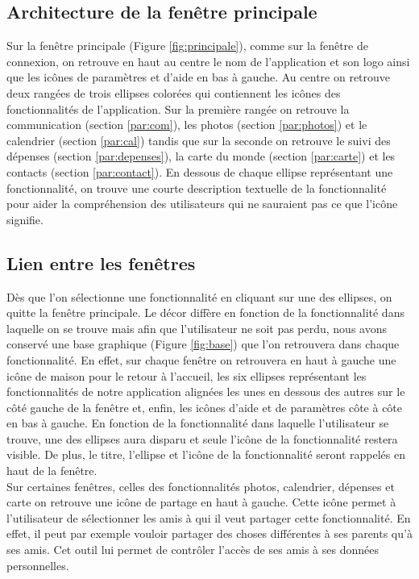 \documentclass[11pt]{article}
\begin{document}
\subsection{Architecture de la fenêtre principale}
Sur la fenêtre principale  (Figure \ref{fig:principale}), comme sur la fenêtre de connexion, on retrouve en haut au centre le nom de l'application et son logo ainsi que les icônes de paramètres et d'aide en bas à gauche. Au centre on retrouve deux rangées de trois ellipses colorées qui contiennent les icônes des fonctionnalités de l'application. Sur la première rangée on retrouve la communication (section \ref{par:com}), les photos (section \ref{par:photos}) et le calendrier (section \ref{par:cal}) tandis que sur la seconde on retrouve le suivi des dépenses (section \ref{par:depenses}), la carte du monde (section \ref{par:carte}) et les contacts (section \ref{par:contact}). En dessous de chaque ellipse représentant une fonctionnalité, on trouve une courte description textuelle de la fonctionnalité pour aider la compréhension des utilisateurs qui ne sauraient pas ce que l'icône signifie.

\subsection{Lien entre les fenêtres}
Dès que l'on sélectionne une fonctionnalité en cliquant sur une des ellipses, on quitte la fenêtre principale. Le décor diffère en fonction de la fonctionnalité dans laquelle on se trouve mais afin que l'utilisateur ne soit pas perdu, nous avons conservé une base graphique (Figure \ref{fig:base}) que l'on retrouvera dans chaque fonctionnalité. En effet, sur chaque fenêtre on retrouvera en haut à gauche une icône de maison pour le retour à l'accueil, les six ellipses représentant les fonctionnalités de notre application alignées les unes en dessous des autres sur le côté gauche de la fenêtre et, enfin, les icônes d'aide et de paramètres côte à côte en bas à gauche.
En fonction de la fonctionnalité dans laquelle l'utilisateur se trouve, une des ellipses aura disparu et seule l'icône de la fonctionnalité restera visible. De plus, le titre, l'ellipse et l'icône de la fonctionnalité seront rappelés en haut de la fenêtre.~\\

Sur certaines fenêtres, celles des fonctionnalités photos, calendrier, dépenses et carte on retrouve une icône de partage en haut à gauche. Cette icône permet à l'utilisateur de sélectionner les amis à qui il veut partager cette fonctionnalité. En effet, il peut par exemple vouloir partager des choses différentes à ses parents qu'à ses amis. Cet outil lui permet de contrôler l'accès de ses amis à ses données personnelles. ~\\
\end{document}
